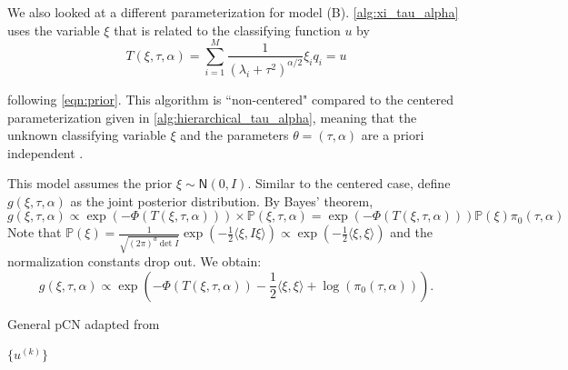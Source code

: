 \documentclass{siamart1116}
\begin{document}
We also looked at a different parameterization for model (B). \cref{alg:xi_tau_alpha} uses the variable $\xi$ that is related to the classifying function $u$ by 
\begin{equation}
\label{eqn:noncentered_T}
T(\xi,\tau,\alpha) = \sum_{i=1}^M \frac{1}{(\lambda_i+\tau^2)^{\alpha/2}}\xi_iq_i = u
\end{equation}

following \cref{eqn:prior}. This algorithm is ``non-centered" compared to the centered parameterization given in \cref{alg:hierarchical_tau_alpha}, meaning that the unknown classifying variable $\xi$ and the parameters $\theta=(\tau,\alpha)$ are a priori independent \cite{Noncentered}.

This model assumes the prior $\xi \sim \mathsf{N}(0,I)$. Similar to the centered case, define $g(\xi,\tau,\alpha)$ as the joint posterior distribution. By Bayes' theorem, 
\[g(\xi,\tau,\alpha) \propto \exp(-\Phi(T(\xi,\tau,\alpha)))\times \mathbb{P}(\xi,\tau,\alpha) = \exp(-\Phi(T(\xi,\tau,\alpha)))\mathbb{P}(\xi)\pi_0(\tau, \alpha)\]
Note that $\mathbb{P}(\xi) = \frac{1}{\sqrt{(2\pi)^d \det I}} \exp(-\frac{1}{2}\langle \xi, I\xi  \rangle) \propto \exp(-\frac{1}{2}\langle \xi,\xi \rangle)$ and the normalization constants drop out. We obtain:
\begin{equation}
\label{eqn:noncentered_post}
g(\xi,\tau,\alpha) \propto \exp\left( -\Phi(T(\xi,\tau,\alpha))-\frac{1}{2}\langle \xi,\xi \rangle + \log(\pi_0(\tau,\alpha)) \right).
\end{equation}

\begin{algorithm}
\caption{General pCN adapted from \cite{CoRoStWh13}}
\label{alg:generalpCN}
\begin{algorithmic}
\EndFor
\State \Return $\{u^{(k)}\}$
\end{algorithmic}
\end{algorithm}
\end{document}

